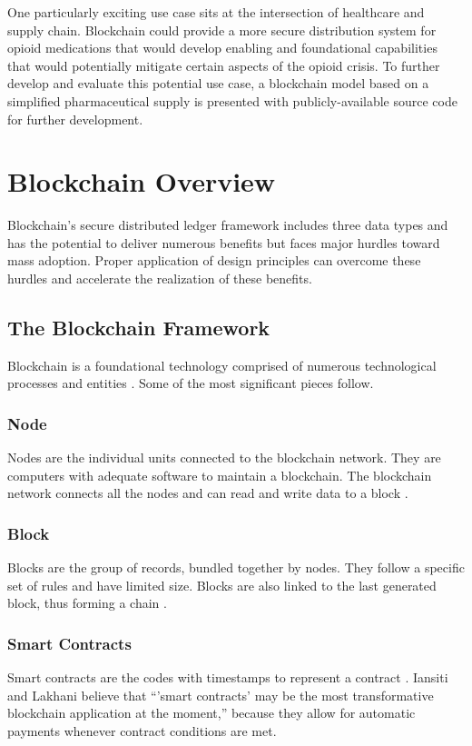 \documentclass[sigconf]{acmart}
\begin{document}
One particularly exciting use case sits at the intersection of healthcare and supply chain. Blockchain could provide a more secure distribution system for opioid medications that would develop enabling and foundational capabilities that would potentially mitigate certain aspects of the opioid crisis. To further develop and evaluate this potential use case, a blockchain model based on a simplified pharmaceutical supply is presented with publicly-available source code for further development.





\section{Blockchain Overview}
Blockchain's secure distributed ledger framework includes three data types and has the potential to deliver numerous benefits but faces major hurdles toward mass adoption. Proper application of design principles can overcome these hurdles and accelerate the realization of these benefits.

\subsection{The Blockchain Framework}
Blockchain is a foundational technology comprised of numerous technological processes and entities \cite{hbr}. Some of the most significant pieces follow.

\subsubsection{Node} Nodes are the individual units connected to the blockchain network. They are computers with adequate software to maintain a blockchain. The blockchain network connects all the nodes and can read and write data to a block \cite{pabc1} \cite{pabc2}.

\subsubsection{Block} Blocks are the group of records, bundled together by nodes. They follow a specific set of rules and have limited size. Blocks are also linked to the last generated block, thus forming a chain \cite{pabc1}.

\subsubsection{Smart Contracts} Smart contracts are the codes with timestamps to represent a contract \cite{pabc1}. Iansiti and Lakhani \cite{hbr} believe that ``'smart contracts' may be the most transformative blockchain application at the moment,'' because they allow for automatic payments whenever contract conditions are met. 
\end{document}
